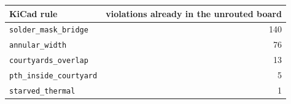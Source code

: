 \begin{tabular}{lr}
\toprule
KiCad rule & violations already in the unrouted board \\
\midrule
\texttt{solder\_mask\_bridge} & 140 \\
\texttt{annular\_width} & 76 \\
\texttt{courtyards\_overlap} & 13 \\
\texttt{pth\_inside\_courtyard} & 5 \\
\texttt{starved\_thermal} & 1 \\
\bottomrule
\end{tabular}
